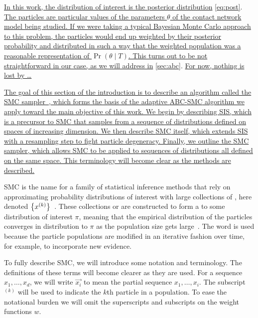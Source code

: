 {\uline{In this work, the distribution of interest is the posterior distribution}
\ref{eq:post}. \uline{The particles are particular values of the parameters
$\theta$ of the contact network model being studied. If we were taking a
typical Bayesian Monte Carlo approach to this problem, the particles would end
up weighted by their posterior probability and distributed in such a way that
the weighted population was a reasonable representation of $\Pr(\theta \mid
T)$. This turns out to be not straightforward in our case, as we will address
in} \cref{sec:abc}. \uline{For now, nothing is lost by \ldots}}

{\color{blue}\uline{
The goal of this section of the introduction is to describe an algorithm called
the \gls{SMC} sampler~\autocite{del2006sequential}, which forms the basis of
the adaptive \gls{ABC}-\gls{SMC} algorithm we apply toward the main objective
of this work. We begin by describing \gls{SIS}, which is a precursor to
\gls{SMC} that samples from a sequence of distributions defined on spaces of
increasing dimension. We then describe \gls{SMC} itself, which extends
\gls{SIS} with a resampling step to fight particle degeneracy. Finally, we
outline the \gls{SMC} sampler, which allows \gls{SMC} to be applied to
sequences of distributions all defined on the same space. This terminology will
become clear as the methods are described.
}}

\Gls{SMC} is the name for a family of statistical inference methods that rely
on approximating probability distributions of interest with large collections
of , here denoted
$\left\lbrace x^{(k)}\right\rbrace$~\autocite{doucet2000sequential, doucet2001introduction,
liu2008monte}. These collections or  are constructed to form
a  to some distribution of interest $\pi$,
meaning that the empirical distribution of the particles converges in
distribution to $\pi$ as the population size gets
large~\autocite{liu2001theoretical}. The word  is used because
the particle populations are modified in an iterative fashion over time, for
example, to incorporate new evidence. 

To fully describe \gls{SMC}, we will introduce some notation and terminology.
The definitions of these terms will become clearer as they are used. For a
sequence $x_1, \ldots, x_d$, we will write $\vec{x_i}$ to mean the partial
sequence $x_1, \ldots, x_i$. The subscript $^{(k)}$ will be used to indicate
the $k$th particle in a population. To ease the notational burden we will omit
the superscripts and subscripts on the weight functions $w$.

